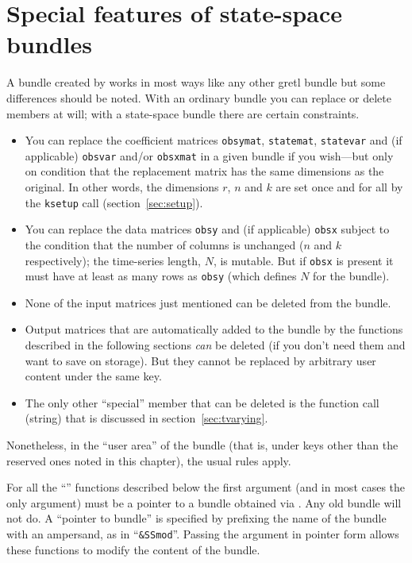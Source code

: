 \section{Special features of state-space bundles}
\label{sec:ss-special}

A bundle created by  works in most ways like any other
gretl bundle but some differences should be noted.  With an ordinary
bundle you can replace or delete members at will; with a state-space
bundle there are certain constraints.

\begin{itemize}
\item You can replace the coefficient matrices \texttt{obsymat},
  \texttt{statemat}, \texttt{statevar} and (if applicable)
  \texttt{obsvar} and/or \texttt{obsxmat} in a given bundle if you
  wish---but only on condition that the replacement matrix has the
  same dimensions as the original. In other words, the dimensions $r$,
  $n$ and $k$ are set once and for all by the \texttt{ksetup} call
  (section~\ref{sec:setup}).
\item You can replace the data matrices \texttt{obsy} and (if
  applicable) \texttt{obsx} subject to the condition that the number
  of columns is unchanged ($n$ and $k$ respectively); the time-series
  length, $N$, is mutable. But if \texttt{obsx} is present it must
  have at least as many rows as \texttt{obsy} (which defines $N$ for
  the bundle).
\item None of the input matrices just mentioned can be deleted from
  the bundle.
\item Output matrices that are automatically added to the bundle by
  the functions described in the following sections \textit{can} be
  deleted (if you don't need them and want to save on storage). But
  they cannot be replaced by arbitrary user content under the same
  key.
\item The only other ``special'' member that can be deleted is the
  function call (string) that is discussed in
  section~\ref{sec:tvarying}.
\end{itemize}

Nonetheless, in the ``user area'' of the bundle (that is, under keys
other than the reserved ones noted in this chapter), the usual rules
apply.

For all the ``'' functions described below the first argument
(and in most cases the only argument) must be a pointer to a bundle
obtained via . Any old bundle will not do. A ``pointer to
bundle'' is specified by prefixing the name of the bundle with an
ampersand, as in ``\verb|&SSmod|''. Passing the argument in pointer
form allows these functions to modify the content of the bundle.

